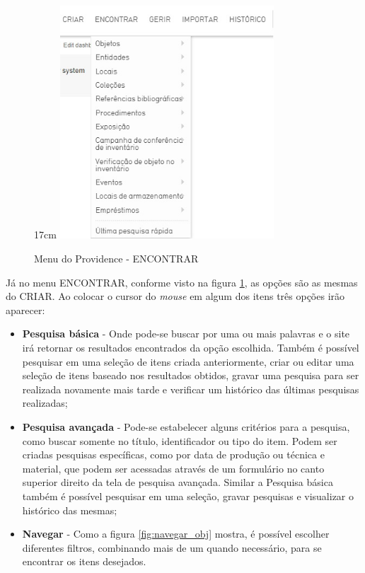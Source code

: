 \documentclass[a4paper,12pt,oneside,onecolumn,final,fleqn]{repUERJ}
\begin{document}
\begin{figure}[!ht]{17cm}
	\includegraphics[width=8cm, center]{figuras/menu_encontrar.jpg}
	\caption{Menu do Providence - ENCONTRAR} \label{fig:menu_encontrar}
\end{figure}

Já no menu ENCONTRAR, conforme visto na figura \ref{fig:menu_encontrar}, as opções são as mesmas do CRIAR. Ao colocar o cursor do \textit{mouse} em algum dos itens três opções irão aparecer: 

\begin{itemize}
	\item \textbf{Pesquisa básica} - Onde pode-se buscar por uma ou mais palavras e o site irá retornar os resultados encontrados da opção escolhida. Também é possível pesquisar em uma seleção de itens criada anteriormente, criar ou editar uma seleção de itens baseado nos resultados obtidos, gravar uma pesquisa para ser realizada novamente mais tarde e verificar um histórico das últimas pesquisas realizadas;
	\item \textbf{Pesquisa avançada} - Pode-se estabelecer alguns critérios para a pesquisa, como buscar somente no título, identificador ou tipo do item. Podem ser criadas pesquisas específicas, como por data de produção ou técnica e material, que podem ser acessadas através de um formulário no canto superior direito da tela de pesquisa avançada. Similar a Pesquisa básica também é possível pesquisar em uma seleção, gravar pesquisas e visualizar o histórico das mesmas;
	\item \textbf{Navegar} - Como a figura \ref{fig:navegar_obj} mostra, é possível escolher diferentes filtros, combinando mais de um quando necessário, para se encontrar os itens desejados.
\end{itemize}
\end{document}
